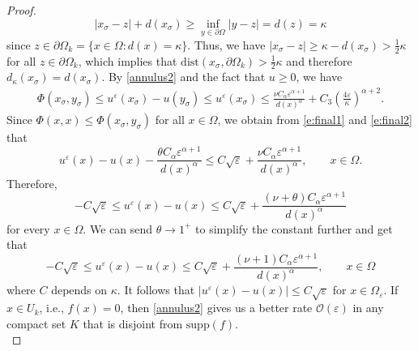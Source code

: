 \documentclass[11pt,reqno]{amsart}
\numberwithin{figure}{section}
\theoremstyle{plain}
\theoremstyle{remark}
\numberwithin{equation}{section}
\begin{document}
\begin{proof}
\begin{equation*}
    |x_\sigma - z| + d(x_\sigma) \geq \inf_{y\in \partial \Omega}|y-z| = d(z) = \kappa
\end{equation*}
since $z\in \partial\Omega_k = \{x \in \Omega: d(x) = \kappa\}$. Thus, we have $|x_\sigma - z| \geq \kappa - d(x_\sigma) > \frac{1}{2}\kappa$ for all $z\in \partial\Omega_k$, which implies that $\mathrm{dist}(x_\sigma,\partial\Omega_k)>\frac{1}{2}\kappa$ and therefore $d_\kappa(x_\sigma) = d(x_\sigma)$. By \eqref{annulus2} and the fact that $u \geq 0$, we have
\begin{align}
    \Phi(x_\sigma, y_\sigma)\leq u^\varepsilon(x_\sigma) - u(y_\sigma)\leq u^\varepsilon(x_\sigma) \leq  \frac{\nu C_\alpha\varepsilon^{\alpha+1}}{d(x)^{\alpha}} + C_3\left(\frac{4\varepsilon}{\kappa}\right)^{\alpha+2} \label{e:final2}.
\end{align}
Since $\Phi(x,x) \leq \Phi(x_\sigma,y_\sigma)$ for all $x\in \Omega$, we obtain from \eqref{e:final1} and \eqref{e:final2} that
\begin{equation*}
    u^\varepsilon(x)-u(x)-\frac{\theta C_\alpha  \varepsilon^{\alpha+1}}{d(x)^\alpha} \leq C\sqrt{\varepsilon} + \frac{\nu C_\alpha\varepsilon^{\alpha+1}}{d(x)^\alpha}, \qquad x\in \Omega.
\end{equation*}
Therefore,
\begin{equation*}
   -C \sqrt{\varepsilon}\leq  u^\varepsilon(x) - u(x) \leq C\sqrt{\varepsilon} + \frac{(\nu+\theta) C_\alpha  \varepsilon^{\alpha+1}}{d(x)^\alpha} 
\end{equation*}
for every $x\in \Omega$. We can send $\theta \to 1^+$ to simplify the constant further and get that 
\begin{equation}
   -C \sqrt{\varepsilon}\leq  u^\varepsilon(x) - u(x) \leq C\sqrt{\varepsilon} + \frac{(\nu+1)C_\alpha  \varepsilon^{\alpha+1}}{d(x)^\alpha}, \qquad x\in \Omega
\end{equation}
where $C$ depends on $\kappa$. It follows that $|u^\varepsilon(x)-u(x)| \leq C\sqrt{\varepsilon}$ for $x\in \Omega_\varepsilon$. 
If $x\in U_k$, i.e., $f(x) = 0$, then \eqref{annulus2} gives us a better rate $\mathcal{O}(\varepsilon)$ in any compact set $K$ that is disjoint from $\mathrm{supp}(f)$. \\


\end{proof}
\end{document}
